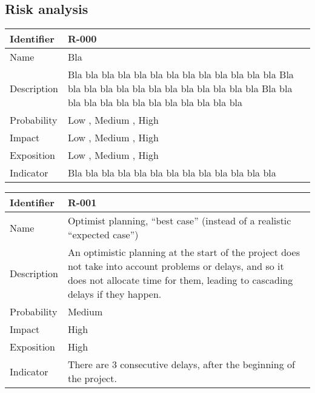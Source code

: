 \subsection{Risk analysis}


\begin{table}[H]
	\begin{tabularx}{\textwidth}{|l|X|}
		\hline
		\rowcolor{gray!30}
		Identifier & \textbf{R-000} \\ \hline
		Name & Bla \\ \hline
		Description & Bla bla bla bla bla bla bla bla bla bla bla bla bla Bla bla bla bla bla bla bla bla bla bla bla bla bla Bla bla bla bla bla bla bla bla bla bla bla bla bla \\ \hline
		Probability & Low , Medium , High \\ \hline
		Impact & Low , Medium , High \\ \hline
		Exposition & Low , Medium , High \\ \hline
		Indicator & Bla bla bla bla bla bla bla bla bla bla bla bla bla \\ \hline
	\end{tabularx}
\end{table}

\begin{table}[H]
	\begin{tabularx}{\textwidth}{|l|X|}
		\hline
		\rowcolor{gray!30}
		Identifier & \textbf{R-001} \\ \hline
		Name & Optimist planning, ``best case'' (instead of a realistic ``expected case'')\\ \hline
		Description & An optimistic planning at the start of the project does not take into account problems or delays, and so it does not allocate time for them, leading to cascading delays if they happen. \\ \hline
		Probability & Medium\\ \hline
		Impact &  High\\ \hline
		Exposition &  High\\ \hline
		Indicator & There are 3 consecutive delays, after the beginning of the project.\\ \hline
	\end{tabularx}
\end{table}



